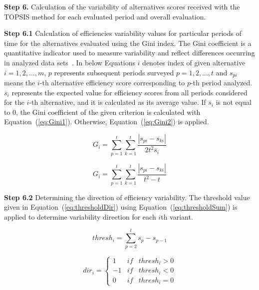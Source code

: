 \documentclass[5p,times]{elsarticle}
\begin{document}
\textbf{Step 6.} Calculation of the variability of alternatives scores received with the TOPSIS method for each evaluated period and overall evaluation.

\textbf{Step 6.1} Calculation of efficiencies variability values for particular periods of time for the alternatives evaluated using the Gini index. 
The Gini coefficient is a quantitative indicator used to measure variability and reflect differences occurring in analyzed data sets~\cite{lai2020sustainable}. In below Equations $i$ denotes index of given alternative $i = 1, 2, \ldots , m$, $p$ represents subsequent periods surveyed $p = 1, 2, \ldots, t$ and $s_{pi}$ means the $i$-th alternative efficiency score corresponding to $p$-th period analyzed. $\overline{s}_{i}$ represents the expected value for efficiency scores from all periods considered for the $i$-th alternative, and it is calculated as its average value. If $\overline{s}_{i}$ is not equal to 0, the Gini coefficient of the given criterion is calculated with Equation~(\ref{eq:Gini1}). Otherwise, Equation~(\ref{eq:Gini2}) is applied.

\begin{equation}
    G_{i} = \sum_{p=1}^{t} \sum_{k=1}^{t} \frac{|s_{pi} - s_{ki}|}{2t^{2}\overline{s}_{i}}
    \label{eq:Gini1}
\end{equation}

\begin{equation}
    G_{i} = \sum_{p=1}^{t} \sum_{k=1}^{t} \frac{|s_{pi} - s_{ki}|}{t^{2} - t}
    \label{eq:Gini2}
\end{equation}

\textbf{Step 6.2} Determining the direction of efficiency variability. The threshold value given in Equation~(\ref{eq:thresholdDir}) using Equation~(\ref{eq:thresholdSum}) is applied to determine variability direction for each $i$th variant.

\begin{equation}
    thresh_{i} = \sum_{p=2}^{t} s_{p} - s_{p-1}
    \label{eq:thresholdSum}
\end{equation}

\begin{equation}
\label{eq:thresholdDir}
dir_i = \left \{ \begin{array}{lll}
1 & if & thresh_{i} > 0  \\
-1 & if & thresh_{i} < 0  \\
0 & if & thresh_{i} = 0
\end{array} \right.
\end{equation}
\end{document}
